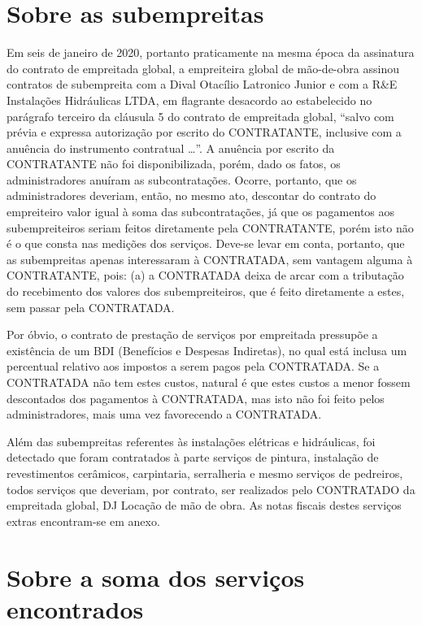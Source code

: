 \documentclass[
  letterpaper,
  DIV=11,
  numbers=noendperiod]{scrreprt}
\begin{document}
\section{Sobre as subempreitas}\label{sobre-as-subempreitas}

Em seis de janeiro de 2020, portanto praticamente na mesma época da
assinatura do contrato de empreitada global, a empreiteira global de
mão-de-obra assinou contratos de subempreita com a Dival Otacílio
Latronico Junior e com a R\&E Instalações Hidráulicas LTDA, em flagrante
desacordo ao estabelecido no parágrafo terceiro da cláusula 5 do
contrato de empreitada global, ``salvo com prévia e expressa autorização
por escrito do CONTRATANTE, inclusive com a anuência do instrumento
contratual \ldots{}''. A anuência por escrito da CONTRATANTE não foi
disponibilizada, porém, dado os fatos, os administradores anuíram as
subcontratações. Ocorre, portanto, que os administradores deveriam,
então, no mesmo ato, descontar do contrato do empreiteiro valor igual à
soma das subcontratações, já que os pagamentos aos subempreiteiros
seriam feitos diretamente pela CONTRATANTE, porém isto não é o que
consta nas medições dos serviços. Deve-se levar em conta, portanto, que
as subempreitas apenas interessaram à CONTRATADA, sem vantagem alguma à
CONTRATANTE, pois: (a) a CONTRATADA deixa de arcar com a tributação do
recebimento dos valores dos subempreiteiros, que é feito diretamente a
estes, sem passar pela CONTRATADA.

Por óbvio, o contrato de prestação de serviços por empreitada pressupõe
a existência de um BDI (Benefícios e Despesas Indiretas), no qual está
inclusa um percentual relativo aos impostos a serem pagos pela
CONTRATADA. Se a CONTRATADA não tem estes custos, natural é que estes
custos a menor fossem descontados dos pagamentos à CONTRATADA, mas isto
não foi feito pelos administradores, mais uma vez favorecendo a
CONTRATADA.

Além das subempreitas referentes às instalações elétricas e hidráulicas,
foi detectado que foram contratados à parte serviços de pintura,
instalação de revestimentos cerâmicos, carpintaria, serralheria e mesmo
serviços de pedreiros, todos serviços que deveriam, por contrato, ser
realizados pelo CONTRATADO da empreitada global, DJ Locação de mão de
obra. As notas fiscais destes serviços extras encontram-se em anexo.

\section{Sobre a soma dos serviços
encontrados}\label{sobre-a-soma-dos-serviuxe7os-encontrados}
\end{document}
